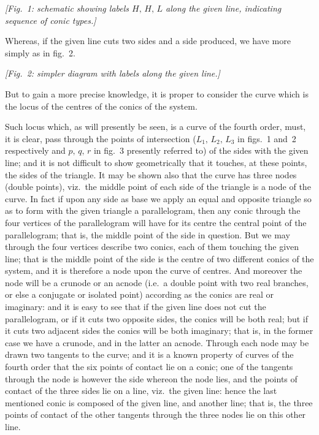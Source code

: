 \documentclass[11pt,a4paper]{article}
\begin{document}
\begin{center}\textit{[Fig.~1: schematic showing labels $H,\,H,\,L$ along the given line, indicating sequence of conic types.]}\end{center}

\medskip

Whereas, if the given line cuts two sides and a side produced, we have more simply as in fig.~2.

\begin{center}\textit{[Fig.~2: simpler diagram with labels along the given line.]}\end{center}

\medskip

But to gain a more precise knowledge, it is proper to consider the curve which is the locus of the centres of the conics of the system.

\medskip

Such locus which, as will presently be seen, is a curve of the fourth order, must, it is clear, pass through the points of intersection ($L_1,\,L_2,\,L_3$ in figs.~1 and~2 respectively and $p,\,q,\,r$ in fig.~3 presently referred to) of the sides with the given line; and it is not difficult to show geometrically that it touches, at these points, the sides of the triangle. It may be shown also that the curve has three nodes (double points), viz.\ the middle point of each side of the triangle is a node of the curve. In fact if upon any side as base we apply an equal and opposite triangle so as to form with the given triangle a parallelogram, then any conic through the four vertices of the parallelogram will have for its centre the central point of the parallelogram; that is, the middle point of the side in question. But we may through the four vertices describe two conics, each of them touching the given line; that is the middle point of the side is the centre of two different conics of the system, and it is therefore a node upon the curve of centres. And moreover the node will be a crunode or an acnode (i.e.\ a double point with two real branches, or else a conjugate or isolated point) according as the conics are real or imaginary: and it is easy to see that if the given line does not cut the parallelogram, or if it cuts two opposite sides, the conics will be both real; but if it cuts two adjacent sides the conics will be both imaginary; that is, in the former case we have a crunode, and in the latter an acnode. Through each node may be drawn two tangents to the curve; and it is a known property of curves of the fourth order that the six points of contact lie on a conic; one of the tangents through the node is however the side whereon the node lies, and the points of contact of the three sides lie on a line, viz.\ the given line: hence the last mentioned conic is composed of the given line, and another line; that is, the three points of contact of the other tangents through the three nodes lie on this other line.
\end{document}
